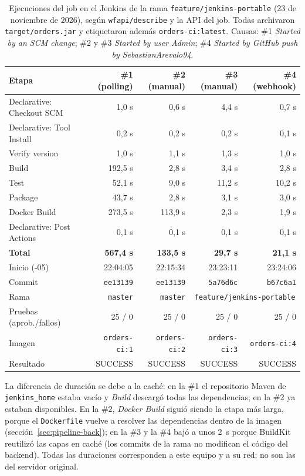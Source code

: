 \documentclass[11pt,a4paper]{article}
\begin{document}
\begin{table}[H]
\centering
\small
\begin{tabular}{@{}l r r r r@{}}
\toprule
\textbf{Etapa} & \textbf{\#1 (polling)} & \textbf{\#2 (manual)} & \textbf{\#3 (manual)} & \textbf{\#4 (webhook)}\\
\midrule
Declarative: Checkout SCM & 1,0 s & 0,6 s & 4,4 s & 0,7 s\\
Declarative: Tool Install & 0,2 s & 0,2 s & 0,2 s & 0,1 s\\
Verify version & 1,0 s & 1,1 s & 1,3 s & 1,0 s\\
Build & 192,5 s & 2,8 s & 3,4 s & 2,8 s\\
Test & 52,1 s & 9,0 s & 11,2 s & 10,2 s\\
Package & 43,7 s & 2,8 s & 3,1 s & 3,0 s\\
Docker Build & 273,5 s & 113,9 s & 2,3 s & 1,9 s\\
Declarative: Post Actions & 0,1 s & 0,1 s & 0,1 s & 0,1 s\\
\midrule
\textbf{Total} & \textbf{567,4 s} & \textbf{133,5 s} & \textbf{29,7 s} & \textbf{21,1 s}\\
\midrule
Inicio (-05) & 22:04:05 & 22:15:34 & 23:23:11 & 23:24:06\\
Commit & \texttt{ee13139} & \texttt{ee13139} & \texttt{5a76d6c} & \texttt{b67c6a1}\\
Rama & \texttt{master} & \texttt{master} & \multicolumn{2}{c}{\texttt{feature/jenkins-portable}}\\
Pruebas (aprob./fallos) & 25 / 0 & 25 / 0 & 25 / 0 & 25 / 0\\
Imagen & \texttt{orders-ci:1} & \texttt{orders-ci:2} & \texttt{orders-ci:3} & \texttt{orders-ci:4}\\
Resultado & \textcolor{ok}{SUCCESS} & \textcolor{ok}{SUCCESS} & \textcolor{ok}{SUCCESS} & \textcolor{ok}{SUCCESS}\\
\bottomrule
\end{tabular}
\caption{Ejecuciones del job en el Jenkins de la rama \texttt{feature/jenkins-portable}
(23 de noviembre de 2026), según \texttt{wfapi/describe} y la API del job. Todas archivaron
\texttt{target/orders.jar} y etiquetaron además \texttt{orders-ci:latest}. Causas: \#1
\emph{Started by an SCM change}; \#2 y \#3 \emph{Started by user Admin}; \#4 \emph{Started by GitHub
push by SebastianArevalo94}.}
\label{tab:builds-local}
\end{table}

La diferencia de duración se debe a la caché: en la \#1 el repositorio Maven de
\texttt{jenkins\_home} estaba vacío y \emph{Build} descargó todas las dependencias; en la \#2 ya
estaban disponibles. En la \#2, \emph{Docker Build} siguió siendo la etapa más larga, porque el
\texttt{Dockerfile} vuelve a resolver las dependencias dentro de la imagen
(sección~\ref{sec:pipeline-back}); en la \#3 y la \#4 bajó a unos 2~s porque BuildKit reutilizó las
capas en caché (los commits de la rama no modifican el código del backend). Todas las duraciones
corresponden a este equipo y a su red; no son las del servidor original.
\end{document}
